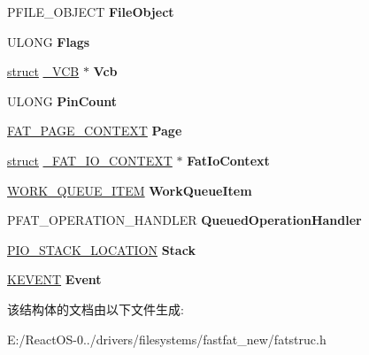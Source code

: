 \begin{DoxyCompactItemize}
P\+F\+I\+L\+E\+\_\+\+O\+B\+J\+E\+CT {\bfseries File\+Object}
\item 
\mbox{\label{struct___f_a_t___i_r_p___c_o_n_t_e_x_t_ab7f8278ff20563a228da9472a0182b59}} 
U\+L\+O\+NG {\bfseries Flags}
\item 
\mbox{\label{struct___f_a_t___i_r_p___c_o_n_t_e_x_t_aef561529dac153294edce5c4d32b0112}} 
\hyperlink{interfacestruct}{struct} \hyperlink{struct___v_c_b}{\+\_\+\+V\+CB} $\ast$ {\bfseries Vcb}
\item 
\mbox{\label{struct___f_a_t___i_r_p___c_o_n_t_e_x_t_a8524ba5c0ef23f87d0ab3a4765176151}} 
U\+L\+O\+NG {\bfseries Pin\+Count}
\item 
\mbox{\label{struct___f_a_t___i_r_p___c_o_n_t_e_x_t_afc0fb8665e9137068a6ee979ac9e5f76}} 
\hyperlink{struct___f_a_t___p_a_g_e___c_o_n_t_e_x_t}{F\+A\+T\+\_\+\+P\+A\+G\+E\+\_\+\+C\+O\+N\+T\+E\+XT} {\bfseries Page}
\item 
\mbox{\label{struct___f_a_t___i_r_p___c_o_n_t_e_x_t_a12ced0aeaa97438210e88c7eee7a6cee}} 
\hyperlink{interfacestruct}{struct} \hyperlink{struct___f_a_t___i_o___c_o_n_t_e_x_t}{\+\_\+\+F\+A\+T\+\_\+\+I\+O\+\_\+\+C\+O\+N\+T\+E\+XT} $\ast$ {\bfseries Fat\+Io\+Context}
\item 
\mbox{\label{struct___f_a_t___i_r_p___c_o_n_t_e_x_t_aa798820e0ef2be6a21a12ae03c5c2aa4}} 
\hyperlink{struct___w_o_r_k___q_u_e_u_e___i_t_e_m}{W\+O\+R\+K\+\_\+\+Q\+U\+E\+U\+E\+\_\+\+I\+T\+EM} {\bfseries Work\+Queue\+Item}
\item 
\mbox{\label{struct___f_a_t___i_r_p___c_o_n_t_e_x_t_a6bfa6325030198b27d1361e958b1cd28}} 
P\+F\+A\+T\+\_\+\+O\+P\+E\+R\+A\+T\+I\+O\+N\+\_\+\+H\+A\+N\+D\+L\+ER {\bfseries Queued\+Operation\+Handler}
\item 
\mbox{\label{struct___f_a_t___i_r_p___c_o_n_t_e_x_t_a94e5aba735a83ad9e9bae73c4e2716b6}} 
\hyperlink{struct___i_o___s_t_a_c_k___l_o_c_a_t_i_o_n}{P\+I\+O\+\_\+\+S\+T\+A\+C\+K\+\_\+\+L\+O\+C\+A\+T\+I\+ON} {\bfseries Stack}
\item 
\mbox{\label{struct___f_a_t___i_r_p___c_o_n_t_e_x_t_a60bb3acc195ea43d9630b98686505939}} 
\hyperlink{struct___k_e_v_e_n_t}{K\+E\+V\+E\+NT} {\bfseries Event}
\end{DoxyCompactItemize}


该结构体的文档由以下文件生成\+:\begin{DoxyCompactItemize}
\item 
E\+:/\+React\+O\+S-\/0../drivers/filesystems/fastfat\+\_\+new/fatstruc.\+h\end{DoxyCompactItemize}
